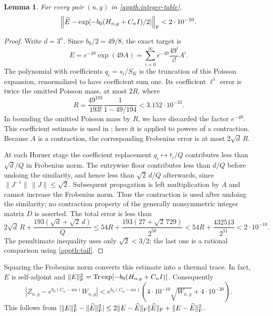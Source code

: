 \documentclass[11pt]{article}
\newtheorem{lemma}[theorem]{Lemma}
\theoremstyle{remark}
\numberwithin{equation}{section}
\begin{document}
\begin{lemma}\label{appth:matrix-error}
For every pair $(n,g)$ in \eqref{appth:integer-table},
\[
 \left\|\widehat E-\exp[-b_0(H_{n,g}+C_n I)/2]\right\|_{\rm F}
       <2\cdot10^{-10}.
\]
\end{lemma}

\begin{proof}
Write $d=3^n$. Since $b_0/2=49/8$, the exact target is
\[
 E=e^{-49}\exp(49A)=\sum_{i=0}^{\infty}
                         e^{-49}\frac{49^i}{i!}A^i.
\]
The polynomial with coefficients $q_i=s_i/S_K$ is the truncation of this
Poisson expansion, renormalized to have coefficient sum one. Its coefficient
$\ell^1$ error is twice the omitted Poisson mass, at most $2R$, where
\begin{equation}\label{appth:tail}
R=\frac{49^{193}}{193!}\frac1{1-49/194}<3.152\cdot10^{-33}.
\end{equation}
In bounding the omitted Poisson mass by $R$, we have discarded the
factor $e^{-49}$. This coefficient estimate is used in
\cite[proof of Proposition 1]{FoxGlynn1988}; here it is applied to
powers of a contraction.
Because $A$ is a contraction, the corresponding Frobenius error is at most
$2\sqrt d\,R$.

At each Horner stage the coefficient replacement $q_i\mapsto t_i/Q$
contributes less than $\sqrt d/Q$ in Frobenius norm. The entrywise floor
contributes less than $d/Q$ before undoing the similarity, and hence less
than $\sqrt2\,d/Q$ afterwards, since
$\|J^{-1}\|\,\|J\|\le\sqrt2$. Subsequent propagation is left
multiplication by $A$ and cannot increase the Frobenius norm. Thus the
contraction is used after undoing the similarity; no contraction
property of the generally nonsymmetric integer matrix $D$ is asserted.
The total error is less than
\begin{equation}\label{appth:frobenius-error}
 2\sqrt d\,R+\frac{193(\sqrt d+\sqrt2\,d)}{Q}
 \le54R+\frac{193(27+\sqrt2\,729)}{2^{50}}
 <54R+\frac{432513}{2^{51}}<2\cdot10^{-10}.
\end{equation}
The penultimate inequality uses only $\sqrt2<3/2$; the last one is a
rational comparison using \eqref{appth:tail}.
\end{proof}

Squaring the Frobenius norm converts this estimate into a thermal trace.
In fact, $E$ is self-adjoint and
$\|E\|_{\rm F}^2=\operatorname{Tr}\exp[-b_0(H_{n,g}+C_n I)]$. Consequently
\begin{equation}\label{appth:partition-error}
 \left|Z_{n,g}-e^{b_0(C_n-an)}W_{n,g}\right|
 <e^{b_0(C_n-an)}
        \left(4\cdot10^{-10}\sqrt{W_{n,g}}+4\cdot10^{-20}\right).
\end{equation}
This follows from
$|\|E\|_{\rm F}^2-\|\widehat E\|_{\rm F}^2|
\le2\|E-\widehat E\|_{\rm F}\|\widehat E\|_{\rm F}
     +\|E-\widehat E\|_{\rm F}^2$.
\end{document}

